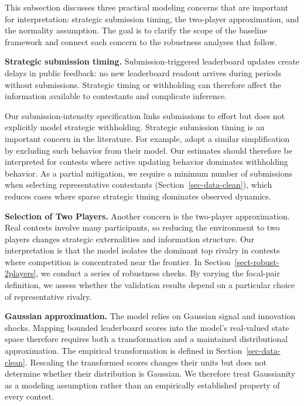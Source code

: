 \documentclass[mnsc]{informs3}
\begin{document}
This subsection discusses three practical modeling concerns that are important for interpretation: strategic submission timing, the two-player approximation, and the normality assumption.
The goal is to clarify the scope of the baseline framework and connect each concern to the robustness analyses that follow.

\textbf{Strategic submission timing.}
Submission-triggered leaderboard updates create delays in public feedback: no new leaderboard readout arrives during periods without submissions. Strategic timing or withholding can therefore affect the information available to contestants and complicate inference.


Our submission-intensity specification links submissions to effort but does not explicitly model strategic withholding.
Strategic submission timing is an important concern in the literature.
For example, \citet{lemus2021dynamic} adopt a similar simplification by excluding such behavior from their model.
Our estimates should therefore be interpreted for contests where active updating behavior dominates withholding behavior.
As a partial mitigation, we require a minimum number of submissions when selecting representative contestants (Section~\ref{sec-data-clean}), which reduces cases where sparse strategic timing dominates observed dynamics.


\textbf{Selection of Two Players.}
Another concern is the two-player approximation.
Real contests involve many participants, so reducing the environment to two players changes strategic externalities and information structure.
Our interpretation is that the model isolates the dominant top rivalry in contests where competition is concentrated near the frontier.
In Section~\ref{sect-robust-2players}, we conduct a series of robustness checks.
By varying the focal-pair definition, we assess whether the validation results depend on a particular choice of representative rivalry.

\textbf{Gaussian approximation.}
The model relies on Gaussian signal and innovation shocks. Mapping bounded leaderboard scores into the model's real-valued state space therefore requires both a transformation and a maintained distributional approximation. The empirical transformation is defined in Section~\ref{sec-data-clean}. Rescaling the transformed scores changes their units but does not determine whether their distribution is Gaussian. We therefore treat Gaussianity as a modeling assumption rather than an empirically established property of every contest.
\end{document}
